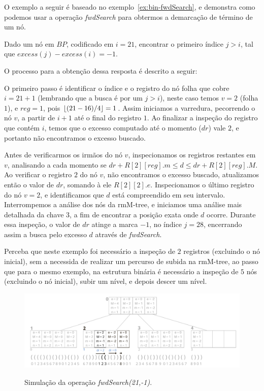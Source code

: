 O exemplo a seguir é baseado no exemplo~\ref{ex:bin-fwdSearch}, e demonstra como podemos usar a operação \textit{fwdSearch} para obtermos a demarcação de término de um nó.
\begin{example}
Dado um nó em $BP$, codificado em $i=21$, encontrar o primeiro índice $j>i$, tal que $excess(j) - excess(i) = -1$.

O processo para a obtenção dessa resposta é descrito a seguir:

 O primeiro passo é identificar  o índice e o registro do nó folha que cobre $i=21+1$ (lembrando que a busca é por um $j > i$), neste caso temos $v = 2$ (folha $1$), e $reg = 1$, pois $\lfloor(21 - 16)/4\rfloor = 1$. Assim iniciamos a varredura, pecorrendo o nó $v$, a partir de $i+1$ até o final do registro $1$. Ao finalizar a inspeção do registro que contém $i$, 
 temos que o excesso computado até o momento ($dr$) vale $2$, e portanto não encontramos o excesso buscado.

Antes de verificarmos os irmãos do nó $v$, inspecionamos os registros restantes em $v$, analisando a cada momento se $dr + R[2][reg].m \leq d \leq dr + R[2][reg].M$. Ao verificar o registro $2$ do nó $v$, não encontramos o excesso buscado, atualizamos então o valor de $dr$, somando à ele $R[2][2].e$. Inspecionamos o último registro do nó $v=2$, e identificamos que $d$ está compreendido em seu intervalo. Interrompemos a análise dos nós da rmM-tree, e iniciamos uma análise mais detalhada da chave $3$, a fim de encontrar a posição exata onde $d$ ocorre. Durante essa inspeção, o valor de $dr$ atinge a marca $-1$, no índice $j=28$, encerrando assim a busca pelo excesso $d$ através de \textit{fwdSearch}.


 Perceba que neste exemplo foi necessário a inspeção de $2$ registros (excluindo o nó inicial), sem a necessida de realizar um percurso de subida na rmM-tree, ao passo que para o mesmo exemplo, na estrutura binária é necessário a inspeção de $5$ nós (excluindo o nó inicial), subir um nível, e depois descer um nível.
 
 \begin{figure}[!ht]
    \centering
      \caption[fwdSearch(21,-1).]{Simulação da operação \textit{fwdSearch(21,-1)}.}
      \includegraphics[width=\columnwidth]{images/rmm-tree-kary-fwdsearch.png}
      \label{fig:kary-fwdSearch}
 \end{figure}
\end{example}

